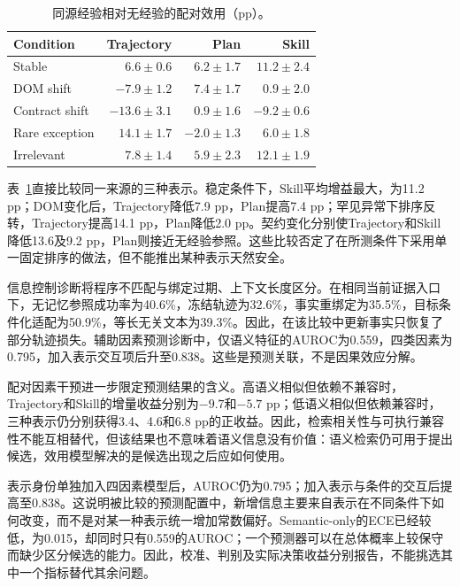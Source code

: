 \documentclass[sigconf,anonymous,review]{acmart}
\theoremstyle{zhplain}
\begin{document}
\begin{table}[t]
\centering
\caption{同源经验相对无经验的配对效用（pp）。}
\label{tab:rq1}
\small
\begin{tabular}{@{}lrrr@{}}
\toprule
Condition & Trajectory & Plan & Skill \\
\midrule
Stable & \(6.6\!\pm\!0.6\) & \(6.2\!\pm\!1.7\) & \(11.2\!\pm\!2.4\) \\
DOM shift & \(-7.9\!\pm\!1.2\) & \(7.4\!\pm\!1.7\) & \(0.9\!\pm\!2.0\) \\
Contract shift & \(-13.6\!\pm\!3.1\) & \(0.9\!\pm\!1.6\) & \(-9.2\!\pm\!0.6\) \\
Rare exception & \(14.1\!\pm\!1.7\) & \(-2.0\!\pm\!1.3\) & \(6.0\!\pm\!1.8\) \\
Irrelevant & \(7.8\!\pm\!1.4\) & \(5.9\!\pm\!2.3\) & \(12.1\!\pm\!1.9\) \\
\bottomrule
\end{tabular}
\end{table}


表~\ref{tab:rq1}直接比较同一来源的三种表示。稳定条件下，Skill平均增益最大，为11.2 pp；DOM变化后，Trajectory降低7.9 pp，Plan提高7.4 pp；罕见异常下排序反转，Trajectory提高14.1 pp，Plan降低2.0 pp。契约变化分别使Trajectory和Skill降低13.6及9.2 pp，Plan则接近无经验参照。这些比较否定了在所测条件下采用单一固定排序的做法，但不能推出某种表示天然安全。

信息控制诊断将程序不匹配与绑定过期、上下文长度区分。在相同当前证据入口下，无记忆参照成功率为40.6\%，冻结轨迹为32.6\%，事实重绑定为35.5\%，目标条件化适配为50.9\%，等长无关文本为39.3\%。因此，在该比较中更新事实只恢复了部分轨迹损失。辅助因素预测诊断中，仅语义特征的AUROC为0.559，四类因素为0.795，加入表示交互项后升至0.838。这些是预测关联，不是因果效应分解。

配对因素干预进一步限定预测结果的含义。高语义相似但依赖不兼容时，Trajectory和Skill的增量收益分别为\(-9.7\)和\(-5.7\) pp；低语义相似但依赖兼容时，三种表示仍分别获得3.4、4.6和6.8 pp的正收益。因此，检索相关性与可执行兼容性不能互相替代，但该结果也不意味着语义信息没有价值：语义检索仍可用于提出候选，效用模型解决的是候选出现之后应如何使用。

表示身份单独加入四因素模型后，AUROC仍为0.795；加入表示与条件的交互后提高至0.838。这说明被比较的预测配置中，新增信息主要来自表示在不同条件下如何改变，而不是对某一种表示统一增加常数偏好。Semantic-only的ECE已经较低，为0.015，却同时只有0.559的AUROC；一个预测器可以在总体概率上较保守而缺少区分候选的能力。因此，校准、判别及实际决策收益分别报告，不能挑选其中一个指标替代其余问题。
\end{document}
